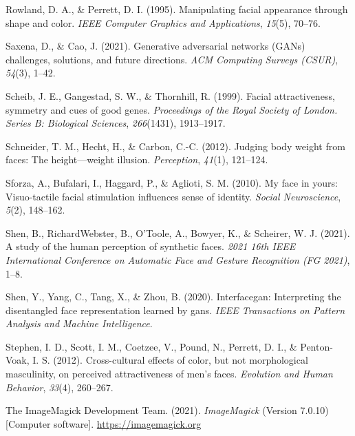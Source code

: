 \documentclass[
  man,floatsintext]{apa6}
\newlength{\cslhangindent}
\newlength{\cslentryspacingunit} %
\newenvironment{CSLReferences}[2] %
 {%
  \setlength{\parindent}{0pt}
  \ifodd #1
  \let\oldpar\par
  \def\par{\hangindent=\cslhangindent\oldpar}
  \fi
  \setlength{\parskip}{#2\cslentryspacingunit}
 }%
 {}
\begin{document}
\begin{CSLReferences}{1}{0}
\leavevmode{}%
Rowland, D. A., \& Perrett, D. I. (1995). Manipulating facial appearance through shape and color. \emph{IEEE Computer Graphics and Applications}, \emph{15}(5), 70--76.

\leavevmode{}%
Saxena, D., \& Cao, J. (2021). Generative adversarial networks (GANs) challenges, solutions, and future directions. \emph{ACM Computing Surveys (CSUR)}, \emph{54}(3), 1--42.

\leavevmode{}%
Scheib, J. E., Gangestad, S. W., \& Thornhill, R. (1999). Facial attractiveness, symmetry and cues of good genes. \emph{Proceedings of the Royal Society of London. Series B: Biological Sciences}, \emph{266}(1431), 1913--1917.

\leavevmode{}%
Schneider, T. M., Hecht, H., \& Carbon, C.-C. (2012). Judging body weight from faces: The height---weight illusion. \emph{Perception}, \emph{41}(1), 121--124.

\leavevmode{}%
Sforza, A., Bufalari, I., Haggard, P., \& Aglioti, S. M. (2010). My face in yours: Visuo-tactile facial stimulation influences sense of identity. \emph{Social Neuroscience}, \emph{5}(2), 148--162.

\leavevmode{}%
Shen, B., RichardWebster, B., O'Toole, A., Bowyer, K., \& Scheirer, W. J. (2021). A study of the human perception of synthetic faces. \emph{2021 16th IEEE International Conference on Automatic Face and Gesture Recognition (FG 2021)}, 1--8.

\leavevmode{}%
Shen, Y., Yang, C., Tang, X., \& Zhou, B. (2020). Interfacegan: Interpreting the disentangled face representation learned by gans. \emph{IEEE Transactions on Pattern Analysis and Machine Intelligence}.

\leavevmode{}%
Stephen, I. D., Scott, I. M., Coetzee, V., Pound, N., Perrett, D. I., \& Penton-Voak, I. S. (2012). Cross-cultural effects of color, but not morphological masculinity, on perceived attractiveness of men's faces. \emph{Evolution and Human Behavior}, \emph{33}(4), 260--267.

\leavevmode{}%
The ImageMagick Development Team. (2021). \emph{ImageMagick} (Version 7.0.10) {[}Computer software{]}. \url{https://imagemagick.org}


\end{CSLReferences}
\end{document}
